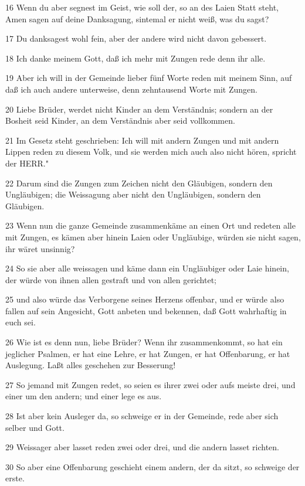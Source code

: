 \par 16 Wenn du aber segnest im Geist, wie soll der, so an des Laien Statt steht, Amen sagen auf deine Danksagung, sintemal er nicht weiß, was du sagst?
\par 17 Du danksagest wohl fein, aber der andere wird nicht davon gebessert.
\par 18 Ich danke meinem Gott, daß ich mehr mit Zungen rede denn ihr alle.
\par 19 Aber ich will in der Gemeinde lieber fünf Worte reden mit meinem Sinn, auf daß ich auch andere unterweise, denn zehntausend Worte mit Zungen.
\par 20 Liebe Brüder, werdet nicht Kinder an dem Verständnis; sondern an der Bosheit seid Kinder, an dem Verständnis aber seid vollkommen.
\par 21 Im Gesetz steht geschrieben: Ich will mit andern Zungen und mit andern Lippen reden zu diesem Volk, und sie werden mich auch also nicht hören, spricht der HERR."
\par 22 Darum sind die Zungen zum Zeichen nicht den Gläubigen, sondern den Ungläubigen; die Weissagung aber nicht den Ungläubigen, sondern den Gläubigen.
\par 23 Wenn nun die ganze Gemeinde zusammenkäme an einen Ort und redeten alle mit Zungen, es kämen aber hinein Laien oder Ungläubige, würden sie nicht sagen, ihr wäret unsinnig?
\par 24 So sie aber alle weissagen und käme dann ein Ungläubiger oder Laie hinein, der würde von ihnen allen gestraft und von allen gerichtet;
\par 25 und also würde das Verborgene seines Herzens offenbar, und er würde also fallen auf sein Angesicht, Gott anbeten und bekennen, daß Gott wahrhaftig in euch sei.
\par 26 Wie ist es denn nun, liebe Brüder? Wenn ihr zusammenkommt, so hat ein jeglicher Psalmen, er hat eine Lehre, er hat Zungen, er hat Offenbarung, er hat Auslegung. Laßt alles geschehen zur Besserung!
\par 27 So jemand mit Zungen redet, so seien es ihrer zwei oder aufs meiste drei, und einer um den andern; und einer lege es aus.
\par 28 Ist aber kein Ausleger da, so schweige er in der Gemeinde, rede aber sich selber und Gott.
\par 29 Weissager aber lasset reden zwei oder drei, und die andern lasset richten.
\par 30 So aber eine Offenbarung geschieht einem andern, der da sitzt, so schweige der erste.
